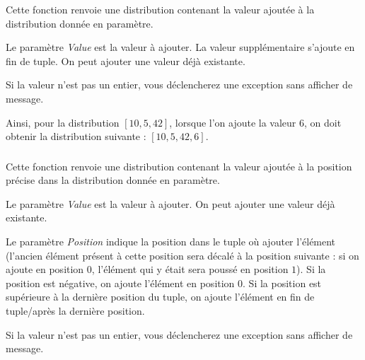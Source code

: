 \noindent Cette fonction renvoie une distribution contenant la valeur ajoutée à la distribution donnée en paramètre.

\noindent Le paramètre \textit{Value} est la valeur à ajouter.
La valeur supplémentaire s'ajoute en fin de tuple.
On peut ajouter une valeur déjà existante.

\noindent Si la valeur n'est pas un entier, vous déclencherez une exception  sans afficher de message.

\medskip

\noindent Ainsi, pour la distribution $ [ 10, 5, 42 ] $, lorsque l'on ajoute la valeur $ 6 $, on doit obtenir la distribution suivante : $ [ 10, 5, 42, 6 ] $.


\subsubsection*{}

\noindent Cette fonction renvoie une distribution contenant la valeur ajoutée à la position précise dans la distribution donnée en paramètre.

\noindent Le paramètre \textit{Value} est la valeur à ajouter.
On peut ajouter une valeur déjà existante.

\noindent Le paramètre \textit{Position} indique la position dans le tuple où ajouter l'élément (l'ancien élément présent à cette position sera décalé à la position suivante : si on ajoute en position $ 0 $, l'élément qui y était sera poussé en position $ 1 $).
Si la position est négative, on ajoute l'élément en position $ 0 $.
Si la position est supérieure à la dernière position du tuple, on ajoute l'élément en fin de tuple/après la dernière position.

\noindent Si la valeur n'est pas un entier, vous déclencherez une exception  sans afficher de message.


\subsubsection*{}

